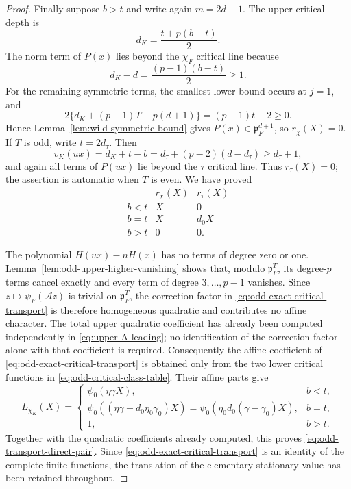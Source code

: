 \documentclass[11pt]{amsart}
\theoremstyle{definition}
\theoremstyle{remark}
\newcommand{\p}{\mathfrak p}
\begin{document}
\begin{proof}
Finally suppose $b>t$ and write again $m=2d+1$.  The upper critical
depth is
\[
 d_K=\frac{t+p(b-t)}2.
\]
The norm term of $P(x)$ lies beyond the $\chi_F$ critical line because
\[
 d_K-d=\frac{(p-1)(b-t)}2\ge1.
\]
For the remaining symmetric terms, the smallest lower bound occurs at
$j=1$, and
\[
 2\{d_K+(p-1)T-p(d+1)\}=(p-1)t-2\ge0.
\]
Hence Lemma~\ref{lem:wild-symmetric-bound} gives
$P(x)\in\p_F^{d+1}$, so $r_\chi(X)=0$.  If $T$ is odd, write
$t=2d_\tau$.  Then
\[
 v_K(ux)=d_K+t-b
 =d_\tau+(p-2)(d-d_\tau)\ge d_\tau+1,
\]
and again all terms of $P(ux)$ lie beyond the $\tau$ critical line.
Thus $r_\tau(X)=0$; the assertion is automatic when $T$ is even.
We have proved
\begin{equation}\label{eq:odd-critical-class-table}
 \begin{array}{c|c|c}
  &r_\chi(X)&r_\tau(X)\\ \hline
  b<t&X&0\\
  b=t&X&d_0X\\
  b>t&0&0.
 \end{array}
\end{equation}

The polynomial $H(ux)-nH(x)$ has no terms of degree zero or one.
Lemma~\ref{lem:odd-upper-higher-vanishing} shows that, modulo
$\p_F^T$, its degree-$p$ terms cancel exactly and every term of degree
$3,\ldots,p-1$ vanishes.  Since
$z\mapsto\psi_F(\mathcal A z)$ is trivial on $\p_F^T$, the correction
factor in \eqref{eq:odd-exact-critical-transport} is therefore
homogeneous quadratic and contributes no affine character.  The total
upper quadratic coefficient has already been computed independently in
\eqref{eq:upper-A-leading}; no identification of the correction factor
alone with that coefficient is required.  Consequently the affine
coefficient of \eqref{eq:odd-exact-critical-transport} is obtained only
from the two lower critical functions in
\eqref{eq:odd-critical-class-table}.  Their affine parts give
\begin{equation}\label{eq:odd-transport-affine-functions}
 L_{\chi_K}(X)=
 \begin{cases}
  \psi_0(\eta\gamma X),&b<t,\\[1mm]
  \psi_0\!\left((\eta\gamma-d_0\eta_0\gamma_0)X\right)
   =\psi_0\!\left(\eta_0d_0(\gamma-\gamma_0)X\right),&b=t,\\[1mm]
  1,&b>t.
 \end{cases}
\end{equation}
Together with the quadratic coefficients already computed, this proves
\eqref{eq:odd-transport-direct-pair}.  Since
\eqref{eq:odd-exact-critical-transport} is an identity of the complete
finite functions, the translation of the elementary stationary value
has been retained throughout.
\end{proof}
\end{document}
